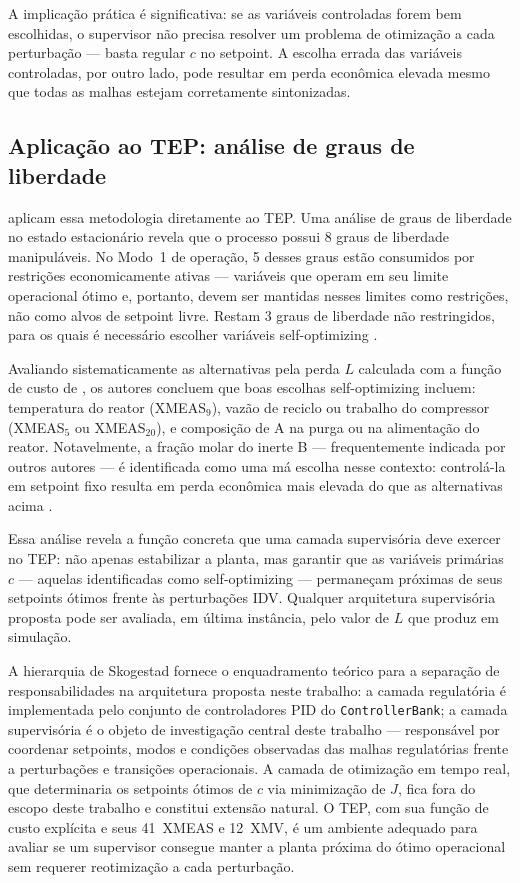 A implicação prática é significativa: se as variáveis controladas forem bem escolhidas, o supervisor
não precisa resolver um problema de otimização a cada perturbação --- basta regular $c$ no setpoint.
A escolha errada das variáveis controladas, por outro lado, pode resultar em perda econômica elevada
mesmo que todas as malhas estejam corretamente sintonizadas.

\subsection{Aplicação ao TEP: análise de graus de liberdade}

 aplicam essa metodologia diretamente ao TEP. Uma análise de graus de
liberdade no estado estacionário revela que o processo possui 8 graus de liberdade manipuláveis.
No Modo~1 de operação, 5 desses graus estão consumidos por restrições economicamente ativas ---
variáveis que operam em seu limite operacional ótimo e, portanto, devem ser mantidas nesses limites
como restrições, não como alvos de setpoint livre. Restam 3 graus de liberdade não restringidos,
para os quais é necessário escolher variáveis self-optimizing \cite{Larsson2000}.

Avaliando sistematicamente as alternativas pela perda $L$ calculada com a função de custo de
, os autores concluem que boas escolhas self-optimizing incluem: temperatura
do reator (XMEAS$_9$), vazão de reciclo ou trabalho do compressor (XMEAS$_5$ ou XMEAS$_{20}$), e
composição de A na purga ou na alimentação do reator. Notavelmente, a fração molar do inerte B ---
frequentemente indicada por outros autores --- é identificada como uma má escolha nesse contexto:
controlá-la em setpoint fixo resulta em perda econômica mais elevada do que as alternativas acima
\cite{Larsson2000}.

Essa análise revela a função concreta que uma camada supervisória deve exercer no TEP: não apenas
estabilizar a planta, mas garantir que as variáveis primárias $c$ --- aquelas identificadas como
self-optimizing --- permaneçam próximas de seus setpoints ótimos frente às perturbações IDV.
Qualquer arquitetura supervisória proposta pode ser avaliada, em última instância, pelo valor de $L$
que produz em simulação.

A hierarquia de Skogestad fornece o enquadramento teórico para a separação de responsabilidades na
arquitetura proposta neste trabalho: a camada regulatória é implementada pelo conjunto de
controladores PID do \texttt{ControllerBank}; a camada supervisória é o objeto de investigação
central deste trabalho --- responsável por coordenar setpoints, modos e condições observadas das
malhas regulatórias frente a perturbações e transições operacionais. A camada de otimização em tempo
real, que determinaria os setpoints ótimos de $c$ via minimização de $J$, fica fora do escopo deste
trabalho e constitui extensão natural. O TEP, com sua função de custo explícita e seus 41~XMEAS e
12~XMV, é um ambiente adequado para avaliar se um supervisor consegue manter a planta próxima do
ótimo operacional sem requerer reotimização a cada perturbação.

